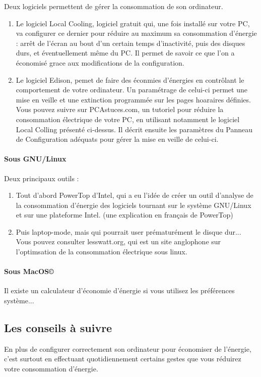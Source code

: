 \documentclass[a4paper,11pt,french]{article}
\begin{document}
Deux logiciels permettent de gérer la consommation de son ordinateur.
\begin{enumerate}
\item Le logiciel Local Cooling, logiciel gratuit qui, une fois installé sur votre PC, va configurer ce dernier pour réduire au maximum sa consommation d'énergie : arrêt de l'écran au bout d'un certain temps d'inactivité, puis des disques durs, et éventuellement même du PC. Il permet de savoir ce que l'on a économisé grace aux modifications de la configuration.
\item Le logiciel Edison, pemet de faire des éconmies d'énergies en contrôlant le comportement de votre ordinateur. Un paramétrage de celui-ci permet une mise en veille et une extinction programmée sur les pages hoaraires définies.
Vous pouvez suivre sur PCAstuces.com, un tutoriel pour réduire la consommation électrique de votre PC, en utilisant notamment le logiciel Local Colling présenté ci-dessus. Il décrit ensuite les paramètres du Panneau de Configuration adéquats pour gérer la mise en veille de celui-ci.
\end{enumerate}

\paragraph{Sous GNU/Linux}
Deux principaux outils :

\begin{enumerate}
\item Tout d'abord PowerTop d'Intel, qui a eu l'idée de créer un outil d'analyse de la consommation d'énergie des logiciels tournant sur le système GNU/Linux et sur une plateforme Intel. (une explication en français de PowerTop)
\item Puis laptop-mode, mais qui pourrait user prématurément le disque dur...
Vous pouvez consulter lesswatt.org, qui est un site anglophone sur l'optimsation de la consommation électrique sous linux.
\end{enumerate}

\paragraph{Sous MacOS\copyright}
Il existe un calculateur d'économie d'énergie si vous utilisez les préférences système...



\subsection{Les conseils à suivre}
En plus de configurer correctement son ordinateur pour économiser de l'énergie, c'est surtout en effectuant quotidiennement certains gestes que vous réduirez votre consommation d'énergie.\\
\end{document}
